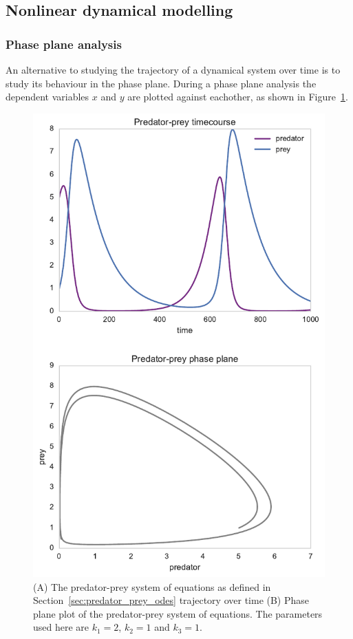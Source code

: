 \subsection{Nonlinear dynamical modelling}

\subsubsection{Phase plane analysis}
An alternative to studying the trajectory of a dynamical system over time is to study its behaviour in the phase plane. During a phase plane analysis the dependent variables $x$ and $y$ are plotted against eachother, as shown in Figure~\ref{fig:pp_phase}.

\begin{figure}[htb]
\centerfloat
    \includegraphics[scale=0.7]{../../chapters/chapterBackgr/images/pp-phaseplane.pdf}
    \caption[Phase plane analysis]{(A) The predator-prey system of equations as defined in Section~\ref{sec:predator_prey_odes} trajectory over time (B) Phase plane plot of the predator-prey system of equations. The parameters used here are $k_1=2$, $k_2=1$ and $k_3=1$.}
    \label{fig:pp_phase}
\end{figure}

